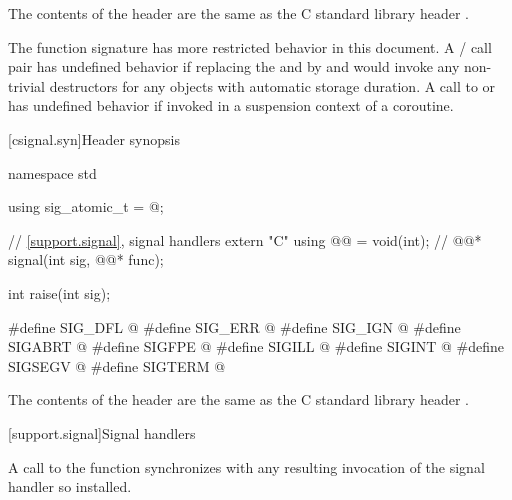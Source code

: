 \pnum
The contents of the header  are the same as the C
standard library header .

\pnum
The function signature
%
has more restricted behavior in this document.
A / call pair has undefined
behavior if replacing the  and 
by  and  would invoke any non-trivial destructors for any objects
with automatic storage duration.
A call to  or  has undefined
behavior if invoked in a suspension context of a coroutine.


[csignal.syn]{Header  synopsis}

%
%
%
%
%
%
%
%
%
%
%
%
\begin{codeblock}
namespace std {
  using sig_atomic_t = @\seebelow@;

  // \ref{support.signal}, signal handlers
  extern "C" using @@ = void(int);  // \expos
  @@* signal(int sig, @@* func);

  int raise(int sig);
}

#define SIG_DFL @\seebelow@
#define SIG_ERR @\seebelow@
#define SIG_IGN @\seebelow@
#define SIGABRT @\seebelow@
#define SIGFPE @\seebelow@
#define SIGILL @\seebelow@
#define SIGINT @\seebelow@
#define SIGSEGV @\seebelow@
#define SIGTERM @\seebelow@
\end{codeblock}

\pnum
The contents of the header  are the same as the C
standard library header .

[support.signal]{Signal handlers}

\pnum
A call to the function  synchronizes with any resulting
invocation of the signal handler so installed.

